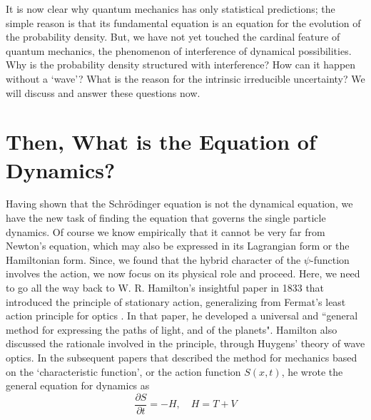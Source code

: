 It is now clear why quantum mechanics has only statistical predictions; the simple reason
is that its fundamental equation is an equation for the evolution of the probability density.
But, we have not yet touched the cardinal feature of quantum mechanics, the phenomenon
of interference of dynamical possibilities. Why is the probability density structured with
interference? How can it happen without a `wave'? What is the reason for the intrinsic
irreducible uncertainty? We will discuss and answer these questions now.

\section{Then, What is the Equation of Dynamics?}\label{c14-sec4}

Having shown that the Schr\"{o}dinger equation is not the dynamical equation, we have
the new task of finding the equation that governs the single particle dynamics. Of course
we know empirically that it cannot be very far from Newton's equation, which may also
be expressed in its Lagrangian form or the Hamiltonian form. Since, we found that the
hybrid character of the $\psi$-function involves the action, we now focus on its physical role
and proceed. Here, we need to go all the way back to W. R. Hamilton's insightful paper
in 1833 that introduced the principle of stationary action, generalizing from Fermat's least
action principle for optics \cite{chap14-key5}. In that paper, he developed a universal and ``general method
for expressing the paths of light, and of the planets". Hamilton also discussed the rationale
involved in the principle, through Huygens' theory of wave optics. In the subsequent papers
\cite{chap14-key6} that described the method for mechanics based on the `characteristic function', or the
action function $S(x, t)$, he wrote the general equation for dynamics as
\begin{equation*}
\frac{\partial S}{\partial t} = -H, \quad H = T + V  \tag{22}\label{c14-eq22}
\end{equation*}

